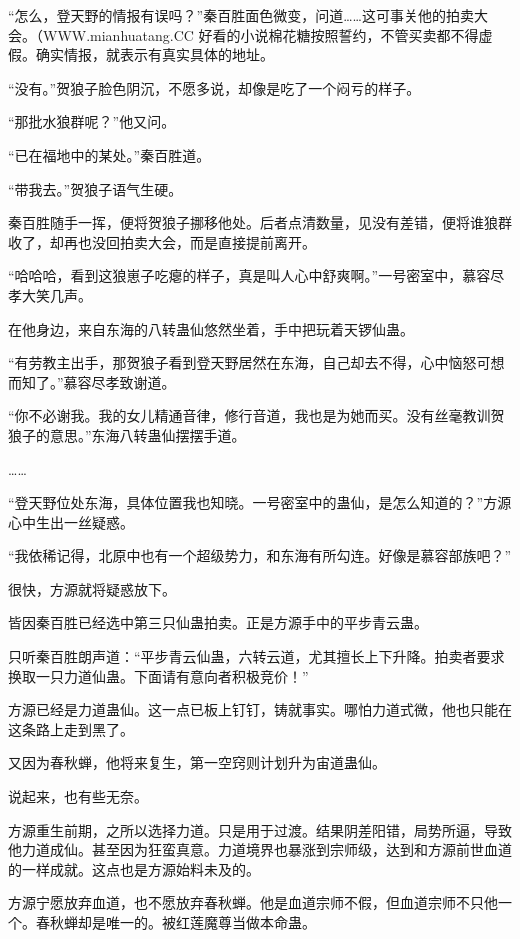 
\begin{this_body}

“怎么，登天野的情报有误吗？”秦百胜面色微变，问道……这可事关他的拍卖大会。（WWW.mianhuatang.CC 好看的小说棉花糖按照誓约，不管买卖都不得虚假。确实情报，就表示有真实具体的地址。

“没有。”贺狼子脸色阴沉，不愿多说，却像是吃了一个闷亏的样子。

“那批水狼群呢？”他又问。

“已在福地中的某处。”秦百胜道。

“带我去。”贺狼子语气生硬。

秦百胜随手一挥，便将贺狼子挪移他处。后者点清数量，见没有差错，便将谁狼群收了，却再也没回拍卖大会，而是直接提前离开。

“哈哈哈，看到这狼崽子吃瘪的样子，真是叫人心中舒爽啊。”一号密室中，慕容尽孝大笑几声。

在他身边，来自东海的八转蛊仙悠然坐着，手中把玩着天锣仙蛊。

“有劳教主出手，那贺狼子看到登天野居然在东海，自己却去不得，心中恼怒可想而知了。”慕容尽孝致谢道。

“你不必谢我。我的女儿精通音律，修行音道，我也是为她而买。没有丝毫教训贺狼子的意思。”东海八转蛊仙摆摆手道。

……

“登天野位处东海，具体位置我也知晓。一号密室中的蛊仙，是怎么知道的？”方源心中生出一丝疑惑。

“我依稀记得，北原中也有一个超级势力，和东海有所勾连。好像是慕容部族吧？”

很快，方源就将疑惑放下。

皆因秦百胜已经选中第三只仙蛊拍卖。正是方源手中的平步青云蛊。

只听秦百胜朗声道：“平步青云仙蛊，六转云道，尤其擅长上下升降。拍卖者要求换取一只力道仙蛊。下面请有意向者积极竞价！”

方源已经是力道蛊仙。这一点已板上钉钉，铸就事实。哪怕力道式微，他也只能在这条路上走到黑了。

又因为春秋蝉，他将来复生，第一空窍则计划升为宙道蛊仙。

说起来，也有些无奈。

方源重生前期，之所以选择力道。只是用于过渡。结果阴差阳错，局势所逼，导致他力道成仙。甚至因为狂蛮真意。力道境界也暴涨到宗师级，达到和方源前世血道的一样成就。这点也是方源始料未及的。

方源宁愿放弃血道，也不愿放弃春秋蝉。他是血道宗师不假，但血道宗师不只他一个。春秋蝉却是唯一的。被红莲魔尊当做本命蛊。


\end{this_body}
